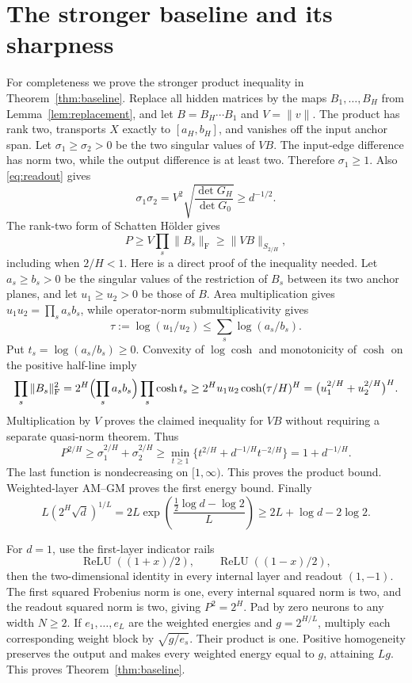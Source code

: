 \documentclass[11pt]{article}
\theoremstyle{remark}\newtheorem{remark}[theorem]{Remark}
\newcommand{\relu}{\operatorname{ReLU}}
\newcommand{\F}{\mathrm F}
\begin{document}
\section{The stronger baseline and its sharpness}
For completeness we prove the stronger product inequality in
Theorem~\ref{thm:baseline}.  Replace all hidden matrices by the maps
$B_1,\ldots,B_H$ from Lemma~\ref{lem:replacement}, and let
$B=B_H\cdots B_1$ and $V=\|v\|$.  The product has rank two, transports
$X$ exactly to $[a_H,b_H]$, and vanishes off the input anchor span.
Let $\sigma_1\ge\sigma_2>0$ be the two singular values of $VB$.
The input-edge difference has norm two, while the output difference is at
least two.  Therefore $\sigma_1\ge1$.  Also \eqref{eq:readout} gives
\[
 \sigma_1\sigma_2
   =V^2\sqrt{\frac{\det G_H}{\det G_0}}\ge d^{-1/2}.
\]
The rank-two form of Schatten H\"older gives
\[
 P\ge V\prod_s\|B_s\|_\F\ge\|VB\|_{S_{2/H}},
\]
including when $2/H<1$. Here is a direct proof of the inequality needed.
Let $a_s\ge b_s>0$ be the singular values of the restriction of $B_s$
between its two anchor planes, and let $u_1\ge u_2>0$ be those of $B$.
Area multiplication gives $u_1u_2=\prod_s a_sb_s$, while operator-norm
submultiplicativity gives
\[
 \tau:=\log(u_1/u_2)\le\sum_s\log(a_s/b_s).
\]
Put $t_s=\log(a_s/b_s)\ge0$. Convexity of $\log\cosh$ and monotonicity
of $\cosh$ on the positive half-line imply
\[
 \prod_s\|B_s\|_\F^2
 =2^H\Bigl(\prod_s a_sb_s\Bigr)\prod_s\cosh t_s
 \ge2^Hu_1u_2\cosh(\tau/H)^H
 =\bigl(u_1^{2/H}+u_2^{2/H}\bigr)^H.
\]
Multiplication by $V$ proves the claimed inequality for $VB$ without
requiring a separate quasi-norm theorem. Thus
\[
 P^{2/H}\ge\sigma_1^{2/H}+\sigma_2^{2/H}
  \ge\min_{t\ge1}\{t^{2/H}+d^{-1/H}t^{-2/H}\}
  =1+d^{-1/H}.
\]
The last function is nondecreasing on $[1,\infty)$.  This proves the
product bound.  Weighted-layer AM--GM proves the first energy bound.
Finally
\[
 L(2^H\sqrt d)^{1/L}
 =2L\exp\left(\frac{\tfrac12\log d-\log2}{L}\right)
 \ge2L+\log d-2\log2.
\]

For $d=1$, use the first-layer indicator rails
\[
 \relu((1+x)/2),\qquad\relu((1-x)/2),
\]
then the two-dimensional identity in every internal layer and readout
$(1,-1)$.  The first squared Frobenius norm is one, every internal squared
norm is two, and the readout squared norm is two, giving $P^2=2^H$.
Pad by zero neurons to any width $N\ge2$.  If $e_1,\ldots,e_L$ are the
weighted energies and $g=2^{H/L}$, multiply each corresponding weight block
by $\sqrt{g/e_s}$.  Their product is one.  Positive homogeneity preserves
the output and makes every weighted energy equal to $g$, attaining $Lg$.
This proves Theorem~\ref{thm:baseline}.
\end{document}

